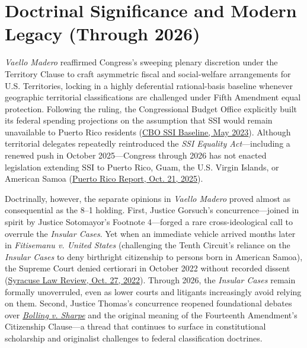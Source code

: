 \documentclass[12pt]{article}
\begin{document}
\section{Doctrinal Significance and Modern Legacy (Through 2026)}
\emph{Vaello Madero} reaffirmed Congress's sweeping plenary discretion under the Territory Clause to craft asymmetric fiscal and social-welfare arrangements for U.S. Territories, locking in a highly deferential rational-basis baseline whenever geographic territorial classifications are challenged under Fifth Amendment equal protection. Following the ruling, the Congressional Budget Office explicitly built its federal spending projections on the assumption that SSI would remain unavailable to Puerto Rico residents (\href{https://www.cbo.gov/system/files/2023-05/51313-2023-05-ssi.pdf}{CBO SSI Baseline, May 2023}). Although territorial delegates repeatedly reintroduced the \emph{SSI Equality Act}---including a renewed push in October 2025---Congress through 2026 has not enacted legislation extending SSI to Puerto Rico, Guam, the U.S. Virgin Islands, or American Samoa (\href{https://puertoricoreport.com/territorial-delegates-reintroduce-ssi-equality-act/}{Puerto Rico Report, Oct. 21, 2025}).

Doctrinally, however, the separate opinions in \emph{Vaello Madero} proved almost as consequential as the 8--1 holding. First, Justice Gorsuch's concurrence---joined in spirit by Justice Sotomayor's Footnote 4---forged a rare cross-ideological call to overrule the \emph{Insular Cases}. Yet when an immediate vehicle arrived months later in \emph{Fitisemanu v. United States} (challenging the Tenth Circuit's reliance on the \emph{Insular Cases} to deny birthright citizenship to persons born in American Samoa), the Supreme Court denied certiorari in October 2022 without recorded dissent (\href{https://lawreview.syr.edu/supreme-court-declines-to-hear-constitutional-challenge-to-citizenship-law/}{Syracuse Law Review, Oct. 27, 2022}). Through 2026, the \emph{Insular Cases} remain formally unoverruled, even as lower courts and litigants increasingly avoid relying on them. Second, Justice Thomas's concurrence reopened foundational debates over \href{https://supreme.justia.com/cases/federal/us/347/497/}{\emph{Bolling v. Sharpe}} and the original meaning of the Fourteenth Amendment's Citizenship Clause---a thread that continues to surface in constitutional scholarship and originalist challenges to federal classification doctrines.
\end{document}
